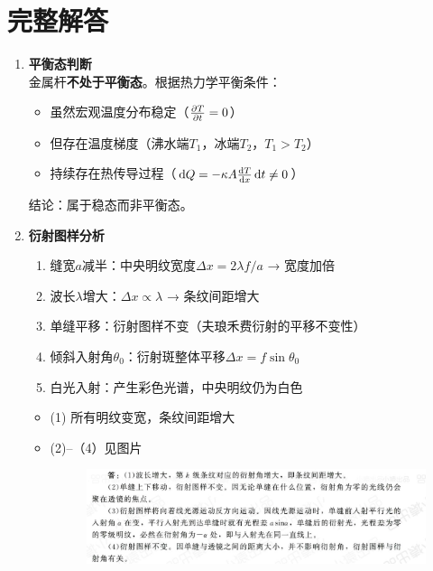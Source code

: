 \documentclass[12pt]{article}
\begin{document}
\section*{完整解答}
\begin{enumerate}
    \item \textbf{平衡态判断} \\
    金属杆\textbf{不处于平衡态}。根据热力学平衡条件：
    \begin{itemize}
        \item 虽然宏观温度分布稳定（$\pdv{T}{t}=0$）
        \item 但存在温度梯度（沸水端$T_1$，冰端$T_2$，$T_1 > T_2$）
        \item 持续存在热传导过程（$\dd{Q} = -\kappa A \dv{T}{x} \dd{t} \neq 0$）
    \end{itemize}
    结论：属于稳态而非平衡态。
    
    \item \textbf{衍射图样分析}
    \begin{enumerate}
        \item 缝宽$a$减半：中央明纹宽度$\Delta x = 2\lambda f/a$ → 宽度加倍
        \item 波长$\lambda$增大：$\Delta x \propto \lambda$ → 条纹间距增大
        \item 单缝平移：衍射图样不变（夫琅禾费衍射的平移不变性）
        \item 倾斜入射角$\theta_0$：衍射斑整体平移$\Delta x = f \sin\theta_0$
        \item 白光入射：产生彩色光谱，中央明纹仍为白色
    \end{enumerate}
          \begin{itemize}
    \item (1) 所有明纹变宽，条纹间距增大
    \item (2)--（4）见图片
    \begin{figure}[H]
        \centering
        \includegraphics[width=1.3\linewidth]{Screenshot_20250416_215216.jpg}
    \end{figure}
  \end{itemize}
  

\end{enumerate}
\end{document}
